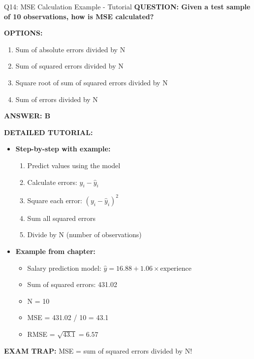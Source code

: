 \documentclass[8pt]{beamer}
\begin{document}
	\begin{frame}{Q14: MSE Calculation Example - Tutorial}
		\fontsize{6.5}{7.5}\selectfont
		\textbf{QUESTION: Given a test sample of 10 observations, how is MSE calculated?}
		
		\vspace{0.1cm}
		\textbf{OPTIONS:}
		\begin{enumerate}
			\item Sum of absolute errors divided by N
			\item Sum of squared errors divided by N
			\item Square root of sum of squared errors divided by N
			\item Sum of errors divided by N
		\end{enumerate}
		
		\vspace{0.1cm}
		\textcolor{myblue}{\textbf{ANSWER: B}}
		
		\vspace{0.1cm}
		\textbf{DETAILED TUTORIAL:}
		\begin{itemize}
			\item \textbf{Step-by-step with example:}
			\begin{enumerate}
				\item Predict values using the model
				\item Calculate errors: $y_i - \hat{y}_i$
				\item Square each error: $(y_i - \hat{y}_i)^2$
				\item Sum all squared errors
				\item Divide by N (number of observations)
			\end{enumerate}
			\item \textbf{Example from chapter:}
			\begin{itemize}
				\item Salary prediction model: $\hat{y} = 16.88 + 1.06 \times \text{experience}$
				\item Sum of squared errors: 431.02
				\item N = 10
				\item MSE = 431.02 / 10 = 43.1
				\item RMSE = $\sqrt{43.1} = 6.57$
			\end{itemize}
		\end{itemize}
		
		\textcolor{myred}{\textbf{EXAM TRAP:}} MSE = \textcolor{myblue}{sum of squared errors divided by N}!
	\end{frame}
	
\end{document}
